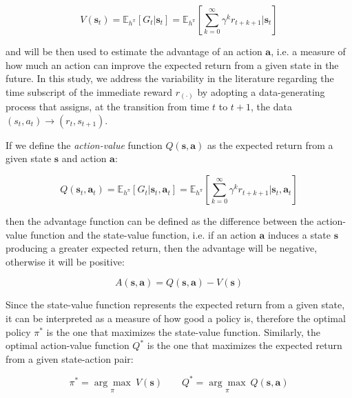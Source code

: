 \begin{equation}
    V(\mathbf{s}_t) = \mathbb{E} _{h^{\pi}} \left[ G _t | \mathbf{s} _t \right] = \mathbb{E} _{h^{\pi}} \left[ \sum ^{\infty} _{k = 0} \gamma ^k r _{t+k+1} | \mathbf{s} _t \right]
\end{equation}

and will be then used to estimate the advantage of an action $\mathbf{a}$, i.e. a measure of how much an action can improve the expected return from a given state in the future. In this study, we address the variability in the literature regarding the time subscript of the immediate reward $r_{(\cdot)}$ by adopting a data-generating process that assigns, at the transition from time $t$ to $t+1$, the data $(s_t, a_t) \rightarrow (r_t, s_{t+1})$.

If we define the \textit{action-value} function $Q(\mathbf{s}, \mathbf{a})$ as the expected return from a given state $\mathbf{s}$ and action $\mathbf{a}$:

\begin{equation}
    Q(\mathbf{s}_t, \mathbf{a}_t) = \mathbb{E} _{h^{\pi}} \left[ G _t | \mathbf{s} _t, \mathbf{a} _t \right] = \mathbb{E} _{h^{\pi}} \left[ \sum ^{\infty} _{k = 0} \gamma ^k r _{t+k+1} | \mathbf{s} _t, \mathbf{a} _t \right]
\end{equation}

then the advantage function can be defined as the difference between the action-value function and the state-value function, i.e. if an action $\mathbf{a}$ induces a state $\mathbf{s}$ producing a greater expected return, then the advantage will be negative, otherwise it will be positive:

\begin{equation}
    A (\mathbf{s}, \mathbf{a}) = Q (\mathbf{s}, \mathbf{a}) - V (\mathbf{s})
\end{equation}

Since the state-value function represents the expected return from a given state, it can be interpreted as a measure of how good a policy is, therefore the optimal policy $\pi ^*$ is the one that maximizes the state-value function. Similarly, the optimal action-value function $Q ^*$ is the one that maximizes the expected return from a given state-action pair:

\begin{equation}
    \pi ^* = \underset{\pi}{\arg\max} \ V (\mathbf{s}) \qquad Q ^* = \underset{\pi}{\arg\max} \ Q (\mathbf{s}, \mathbf{a})
\end{equation}

